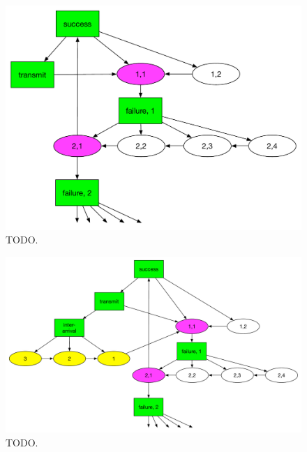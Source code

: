 \documentclass{llncs}
\begin{document}
\begin{figure}
\begin{center}
\includegraphics[scale=0.35]{../../sketches/compressible_dcf.pdf}
\caption{TODO.}
\label{fig:compressible_dcf}
\end{center}
\end{figure}

\begin{figure}
\begin{center}
\includegraphics[scale=0.35]{../../sketches/compressible_dcf_arrival.pdf}
\caption{TODO.}
\label{fig:compressible_dcf_arrival}
\end{center}
\end{figure}
\end{document}
